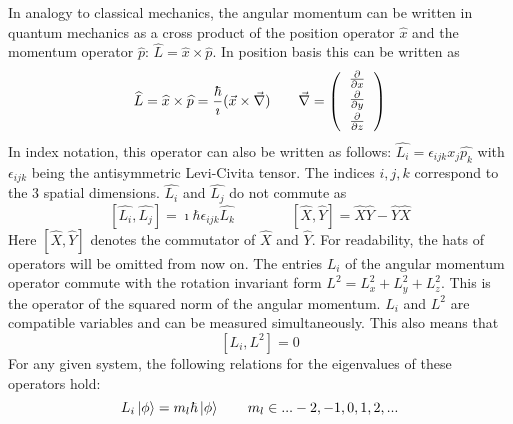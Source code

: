 In analogy to classical mechanics, the angular momentum can be written in quantum mechanics as a cross product of the position operator \textit{$\widehat{x}$} and the momentum operator \textit{$\widehat{p}$}: $\widehat{L} = \widehat{x} \times \widehat{p}$. In position basis this can be written as
\begin{equation}
 \widehat{L} = \widehat{x} \times \widehat{p} = \frac{\hbar}{\imath}(\vec{x}\times \vec{\nabla}) \hspace{2em} \vec{\nabla}= \left (
  \begin{tabular}{c}
  $\frac{\partial}{\partial x}$\vspace{0.2em}\\
  $\frac{\partial}{\partial y}$\vspace{0.2em}\\
  $\frac{\partial}{\partial z}$\vspace{0.2em}
  \end{tabular}
\right )
\end{equation} 
In index notation, this operator can also be written as follows: $\widehat{L_{i}}=\epsilon_{ijk} x_{j}\widehat{p_{k}}$ with $\epsilon_{ijk}$ being the antisymmetric Levi-Civita tensor. The indices $i,j,k$ correspond to the 3 spatial dimensions. $\widehat{L_{i}}$ and $\widehat{L_{j}}$ do not commute as 
\begin{equation}  
\label{eq:LCommutator1}
 [\widehat{L_{i}},\widehat{L_{j}}]=\imath\hbar\epsilon_{ijk}\widehat{L_{k}} \hspace{4em}  [\widehat{X},\widehat{Y}] = \widehat{X}\widehat{Y} - \widehat{Y}\widehat{X}                                                                                                                                                                                                \end{equation} 
Here $[\widehat{X},\widehat{Y}]$ denotes the commutator of $\widehat{X}$ and $\widehat{Y}$. For readability, the hats of operators will be omitted from now on. The entries $L_{i}$ of the angular momentum operator commute with the rotation invariant form $L^{2} = L_{x}^2+L_{y}^2+L_{z}^2$. This is the operator of the squared norm of the angular momentum. $L_{i}$ and $L^{2}$ are compatible variables and can be measured simultaneously. This also means that
\begin{equation}
\label{eq:LCommutator2}
 [L_{i},L^{2}]=0
\end{equation} 
For any given system, the following relations for the eigenvalues of these operators hold:
\begin{equation}
\label{eq:ml}
 L_{i}\ket{\phi}=m_{l}\hbar\ket{\phi} \hspace{2em} m_{l}\in{...-2,-1,0,1,2,...}
\end{equation} 
